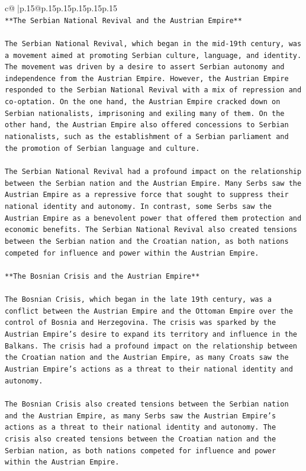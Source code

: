 \documentclass{article}
\begin{document}
{\begin{supertabular}{c@{$\;$}|p{.15\linewidth}@{}p{.15\linewidth}p{.15\linewidth}p{.15\linewidth}p{.15\linewidth}p{.15\linewidth}}
{{{\\ 
\texttt{**The Serbian National Revival and the Austrian Empire**} \\
\\ 
\texttt{The Serbian National Revival, which began in the mid{-}19th century, was a movement aimed at promoting Serbian culture, language, and identity. The movement was driven by a desire to assert Serbian autonomy and independence from the Austrian Empire. However, the Austrian Empire responded to the Serbian National Revival with a mix of repression and co{-}optation. On the one hand, the Austrian Empire cracked down on Serbian nationalists, imprisoning and exiling many of them. On the other hand, the Austrian Empire also offered concessions to Serbian nationalists, such as the establishment of a Serbian parliament and the promotion of Serbian language and culture.} \\
\\ 
\texttt{The Serbian National Revival had a profound impact on the relationship between the Serbian nation and the Austrian Empire. Many Serbs saw the Austrian Empire as a repressive force that sought to suppress their national identity and autonomy. In contrast, some Serbs saw the Austrian Empire as a benevolent power that offered them protection and economic benefits. The Serbian National Revival also created tensions between the Serbian nation and the Croatian nation, as both nations competed for influence and power within the Austrian Empire.} \\
\\ 
\texttt{**The Bosnian Crisis and the Austrian Empire**} \\
\\ 
\texttt{The Bosnian Crisis, which began in the late 19th century, was a conflict between the Austrian Empire and the Ottoman Empire over the control of Bosnia and Herzegovina. The crisis was sparked by the Austrian Empire's desire to expand its territory and influence in the Balkans. The crisis had a profound impact on the relationship between the Croatian nation and the Austrian Empire, as many Croats saw the Austrian Empire's actions as a threat to their national identity and autonomy.} \\
\\ 
\texttt{The Bosnian Crisis also created tensions between the Serbian nation and the Austrian Empire, as many Serbs saw the Austrian Empire's actions as a threat to their national identity and autonomy. The crisis also created tensions between the Croatian nation and the Serbian nation, as both nations competed for influence and power within the Austrian Empire.} \\
}}}
\end{supertabular}}
\end{document}
